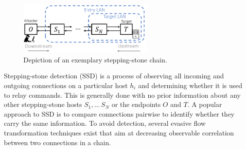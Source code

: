 \documentclass[runningheads,11pt]{llncs}\usepackage[]{graphicx}\usepackage[]{color}
\begin{document}
\begin{figure}
\centering
\includegraphics[width=0.6\textwidth]{images/Stepstone_final_2.png}
\caption{Depiction of an exemplary stepping-stone chain.}\label{Fig:Stepstone}
\vspace{-0.6cm}
\end{figure}


Stepping-stone detection (SSD) is a process of observing all incoming and outgoing connections on a particular host $h_i$ and determining whether it is used to relay commands. This is generally done with no prior information about any other stepping-stone hosts $S_1,\dots\,S_N$ or the endpoints $O$ and $T$. A popular approach to SSD is to compare connections pairwise to identify whether they carry the same information. To avoid detection, several evasive flow transformation techniques exist that aim at decreasing observable correlation between two connections in a chain. 
 

\end{document}
